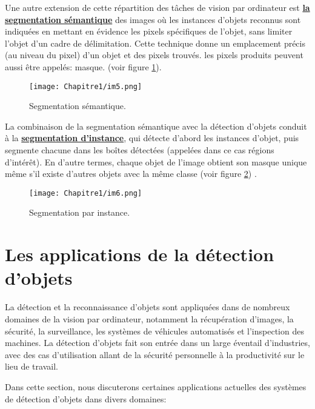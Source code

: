 Une autre extension de cette répartition des tâches de vision par ordinateur est \underline{\textbf{la segmentation sémantique}}  des images où les instances d'objets reconnus sont indiquées en mettant en évidence les pixels spécifiques de l'objet,  sans limiter l'objet d'un cadre de délimitation.  Cette technique donne un emplacement précis (au niveau du pixel) d'un objet et des pixels trouvés. les pixels produits peuvent aussi être appelés: masque.
(voir figure \ref{im5}).


\begin{figure}[H]
\centering
\texttt{[image: Chapitre1/im5.png]}
\caption{Segmentation sémantique.}
\label{im5}
\end{figure}

La combinaison de la segmentation sémantique avec la détection d'objets conduit à la \underline{\textbf{segmentation d'instance}}, qui détecte d'abord les instances d'objet, puis segmente chacune dans les boîtes détectées (appelées dans ce cas régions d'intérêt). En d'autre termes, chaque objet de l'image obtient son masque unique même s'il existe d'autres objets avec la même classe (voir figure \ref{im6}) .    

\begin{figure}[H]
\centering
\texttt{[image: Chapitre1/im6.png]}
\caption{Segmentation par instance.}
\label{im6}
\end{figure}     


\section{Les applications de la détection d'objets}
La détection et la reconnaissance d'objets sont appliquées dans de nombreux domaines de la vision par ordinateur, notamment la récupération d'images, la sécurité, la surveillance, les systèmes de véhicules automatisés et l'inspection des machines. La détection d'objets fait son entrée dans un large éventail d'industries, avec des cas d'utilisation allant de la sécurité personnelle à la productivité sur le lieu de travail.

Dans cette section, nous discuterons  certaines applications actuelles  des systèmes de détection d'objets dans divers domaines:
